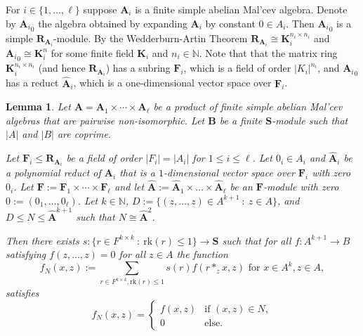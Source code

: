 \documentclass[12pt]{amsart}
\numberwithin{equation}{section}
\theoremstyle{plain}
\newtheorem{lemma}[theorem]{Lemma}
\theoremstyle{definition}
\newcommand{\st}{\ :\ }
\newcommand{\A}{\mathbf{A}}
\newcommand{\B}{\mathbf{B}}
\newcommand{\F}{\mathbf{F}}
\newcommand{\K}{\mathbf{K}}
\newcommand{\N}{\mathbb{N}}
\newcommand{\R}{\mathbf{R}}
\renewcommand{\S}{\mathbf{S}}
\newcommand{\rk}{\mathrm{rk}}
\begin{document}
For $i \in \{1, \ldots, \ell \}$ suppose $\A_i$ is a finite simple abelian Mal'cev algebra. 
Denote by ${\A_i}_0$ the algebra obtained by expanding $\A_i$ by constant $0 \in A_i$.
Then ${\A_i}_0$ is a simple $\R_{\A_i}$-module. 
By the Wedderburn-Artin Theorem $\R_{\A_i} \cong \K_i^{n_i\times n_i}$ 
  and ${\A_i}_0 \cong \K_i^n$ for some finite field $\K_i$ and $n_i \in\N$.
Note that that the matrix ring $\K_i^{n_i\times n_i}$ (and hence $\R_{\A_i}$) 
  has a subring $\F_i$, which is a field of order $|K_i|^{n_i}$, and ${\A_i}_0$ has 
  a reduct $\hat{\A}_i$, which is a one-dimensional vector space over $\F_i$.
 

\begin{lemma} \label{lem:malcev}
 Let $\A = \A_1 \times \cdots \times \A_\ell$ be a product of finite simple abelian Mal'cev algebras 
  that are pairwise non-isomorphic.
 Let $\B$ be a finite $\S$-module such that $|A|$ and $|B|$ are coprime.
 
 Let $\F_i \leq\R_{\A_i}$ be a field of order $|F_i|=|A_i|$ for $1 \le i \le \ell$.
 Let $0_i \in A_i$ and $\hat{\A}_i$ be a polynomial reduct of $\A_i$ that is
  a $1$-dimensional vector space over $\F_i$ with zero $0_i$.
 Let $\F := \F_1 \times \cdots \times \F_\ell$ 
  and let $\hat{\A} := \hat{\A}_1 \times \dots \times \hat{\A}_\ell$ be an $\F$-module 
  with zero $0:= (0_1, \ldots, 0_\ell)$. 
 Let $k\in\N$, $D := \{ (z,\dots,z) \in A^{k+1} \st z\in A \}$, and $D\leq N\leq\hat{\A}^{k+1}$ 
  such that $N\cong\hat{\A}^2$.
 
  Then there exists $s\colon \{r\in F^{k\times k} \st \rk(r) \leq 1 \} \to \S$ such that for all
    $f\colon A^{k+1}\to B$ satisfying $f(z,\dots,z)=0$ for all $z\in A$
    the function
    \[ f_N(x,z) := \sum_{r\in F^{k\times k}, \rk(r)\leq 1} s(r) f(r*_zx,z) \text{ for } x\in A^k, z\in A, \]
    satisfies
    \[ f_N(x,z) = 
      \begin{cases} 
        f(x,z) & \text{if } (x,z)\in N, \\
        0 & \text{else}. 
      \end{cases} 
    \]
\end{lemma}
\end{document}
